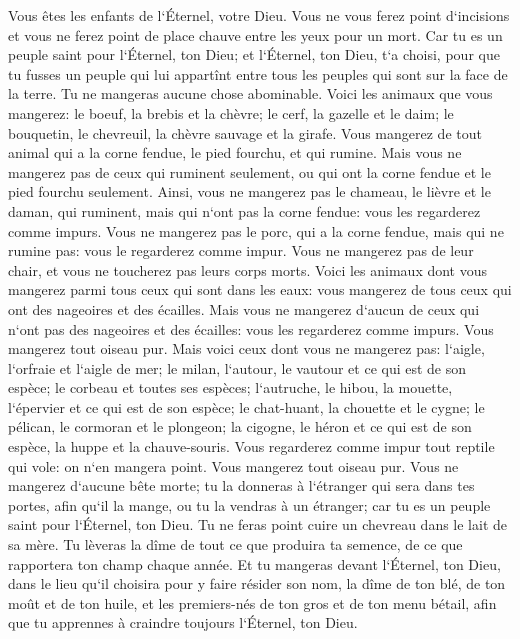 \verse Vous êtes les enfants de l`Éternel, votre Dieu. Vous ne vous ferez point d`incisions et vous ne ferez point de place chauve entre les yeux pour un mort. 
\verse Car tu es un peuple saint pour l`Éternel, ton Dieu; et l`Éternel, ton Dieu, t`a choisi, pour que tu fusses un peuple qui lui appartînt entre tous les peuples qui sont sur la face de la terre. 
\verse Tu ne mangeras aucune chose abominable. 
\verse Voici les animaux que vous mangerez: le boeuf, la brebis et la chèvre; 
\verse le cerf, la gazelle et le daim; le bouquetin, le chevreuil, la chèvre sauvage et la girafe. 
\verse Vous mangerez de tout animal qui a la corne fendue, le pied fourchu, et qui rumine. 
\verse Mais vous ne mangerez pas de ceux qui ruminent seulement, ou qui ont la corne fendue et le pied fourchu seulement. Ainsi, vous ne mangerez pas le chameau, le lièvre et le daman, qui ruminent, mais qui n`ont pas la corne fendue: vous les regarderez comme impurs. 
\verse Vous ne mangerez pas le porc, qui a la corne fendue, mais qui ne rumine pas: vous le regarderez comme impur. Vous ne mangerez pas de leur chair, et vous ne toucherez pas leurs corps morts. 
\verse Voici les animaux dont vous mangerez parmi tous ceux qui sont dans les eaux: vous mangerez de tous ceux qui ont des nageoires et des écailles. 
\verse Mais vous ne mangerez d`aucun de ceux qui n`ont pas des nageoires et des écailles: vous les regarderez comme impurs. 
\verse Vous mangerez tout oiseau pur. 
\verse Mais voici ceux dont vous ne mangerez pas: l`aigle, l`orfraie et l`aigle de mer; 
\verse le milan, l`autour, le vautour et ce qui est de son espèce; 
\verse le corbeau et toutes ses espèces; 
\verse l`autruche, le hibou, la mouette, l`épervier et ce qui est de son espèce; 
\verse le chat-huant, la chouette et le cygne; 
\verse le pélican, le cormoran et le plongeon; 
\verse la cigogne, le héron et ce qui est de son espèce, la huppe et la chauve-souris. 
\verse Vous regarderez comme impur tout reptile qui vole: on n`en mangera point. 
\verse Vous mangerez tout oiseau pur. 
\verse Vous ne mangerez d`aucune bête morte; tu la donneras à l`étranger qui sera dans tes portes, afin qu`il la mange, ou tu la vendras à un étranger; car tu es un peuple saint pour l`Éternel, ton Dieu. Tu ne feras point cuire un chevreau dans le lait de sa mère. 
\verse Tu lèveras la dîme de tout ce que produira ta semence, de ce que rapportera ton champ chaque année. 
\verse Et tu mangeras devant l`Éternel, ton Dieu, dans le lieu qu`il choisira pour y faire résider son nom, la dîme de ton blé, de ton moût et de ton huile, et les premiers-nés de ton gros et de ton menu bétail, afin que tu apprennes à craindre toujours l`Éternel, ton Dieu. 
